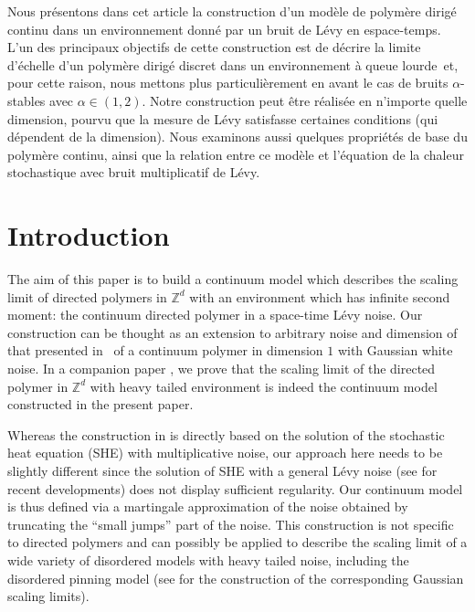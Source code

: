 \documentclass[JEP,XML,SOM,Unicode,published]{cedram}
\theoremstyle{definition}
\newcommand{\bbZ}{{\ensuremath{\mathbb Z}} }
\begin{document}
\begin{altabstract}
Nous présentons dans cet article la construction d’un modèle de polymère dirigé continu dans un environnement donné par un bruit de Lévy en espace-temps. L’un des principaux objectifs de cette construction est de décrire la limite d’échelle d'un polymère dirigé discret dans un environnement à queue lourde~et, pour cette raison, nous mettons plus particulièrement en avant le cas de bruits $\alpha$-stables avec $\alpha \in (1,2)$. Notre construction peut être réalisée en n’importe quelle dimension, pourvu que la mesure de Lévy satisfasse certaines conditions (qui dépendent de la dimension). Nous examinons aussi quelques propriétés de base du polymère continu, ainsi que la relation entre ce modèle et l’équation de la chaleur stochastique avec bruit multiplicatif de Lévy.
\end{altabstract}
\maketitle
\vspace*{-\baselineskip}
\enlargethispage{.5\baselineskip}
{\let\\ \relax \tableofcontents}
\mainmatter

\section{Introduction}

The aim of this paper is to build a continuum model which describes the scaling limit of directed polymers in $\bbZ^d$ with an environment which has infinite second moment:
the continuum directed polymer in a space-time Lévy noise.
Our construction can be thought as an extension to arbitrary noise and dimension of that presented in~\cite{AKQ14b} of a continuum polymer in dimension $1$ with Gaussian white noise.
In a companion paper \cite{BL20_disc}, we prove that the scaling limit of the directed polymer in $\bbZ^d$ with heavy tailed environment is indeed the continuum model constructed in the present paper.

Whereas the construction in \cite{AKQ14b} is directly based on the solution of the stochastic heat equation (SHE) with multiplicative noise, our approach here needs to be slightly different since the solution of SHE with a general Lévy noise (see \cite{Chong17} for recent developments) does not display sufficient regularity. Our continuum model is thus defined via a martingale approximation of the noise obtained by truncating the ``small jumps'' part of the noise. This construction is not specific to directed polymers and can possibly be applied to describe the scaling limit of a wide variety of disordered models with heavy tailed noise, including the disordered pinning model (see \cite{CSZ14,CSZ13} for the construction of the corresponding Gaussian scaling limits).
\end{document}

